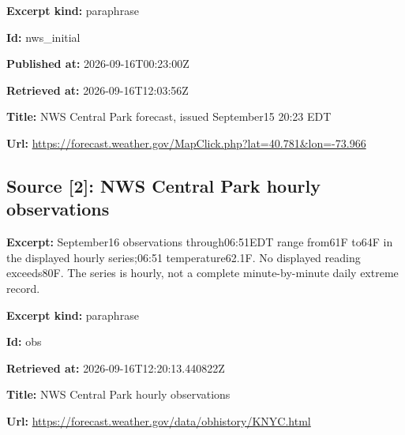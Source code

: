 \documentclass[11pt]{article}
\begin{document}
\par\noindent\textbf{Excerpt kind:} paraphrase

\par\noindent\textbf{Id:} nws\_initial

\par\noindent\textbf{Published at:} 2026-09-16T00:23:00Z

\par\noindent\textbf{Retrieved at:} 2026-09-16T12:03:56Z

\par\noindent\textbf{Title:} NWS Central Park forecast, issued September15 20:23 EDT

\par\noindent\textbf{Url:} \href{https://forecast.weather.gov/MapClick.php?lat=40.781\&lon=-73.966}{https://fore\hspace{0pt}cast.weather\hspace{0pt}.gov/MapClic\hspace{0pt}k.php?lat=40\hspace{0pt}.781\&lon=-73\hspace{0pt}.966}

\subsection*{\textcolor{epdarkgreen}{Source [2]: NWS Central Park hourly observations}}
\par\noindent\textbf{Excerpt:} September16 observations through06:51EDT range from61F to64F in the displayed hourly series;06:51 temperature62.1F. No displayed reading exceeds80F. The series is hourly, not a complete minute-by-minute daily extreme record.

\par\noindent\textbf{Excerpt kind:} paraphrase

\par\noindent\textbf{Id:} obs

\par\noindent\textbf{Retrieved at:} 2026-09-16T12:20:13.440822Z

\par\noindent\textbf{Title:} NWS Central Park hourly observations

\par\noindent\textbf{Url:} \href{https://forecast.weather.gov/data/obhistory/KNYC.html}{https://fore\hspace{0pt}cast.weather\hspace{0pt}.gov/data/ob\hspace{0pt}history/KNYC\hspace{0pt}.html}
\end{document}

